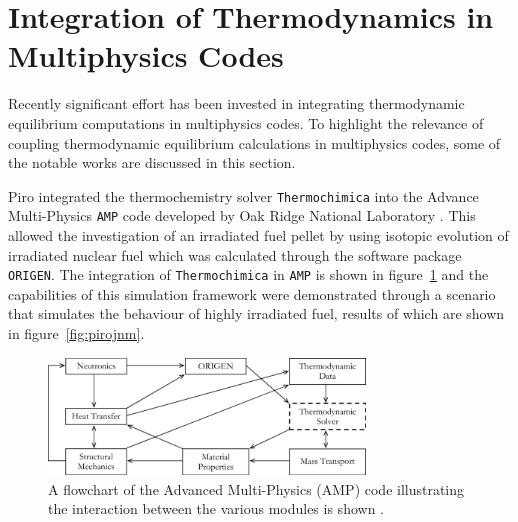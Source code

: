 \section{Integration of Thermodynamics in Multiphysics Codes}

	Recently significant effort has been invested in integrating thermodynamic equilibrium computations in multiphysics codes.  To highlight the relevance of coupling thermodynamic equilibrium calculations in multiphysics codes, some of the notable works are discussed in this section.

	Piro integrated the thermochemistry solver \texttt{Thermochimica} into the Advance Multi-Physics \texttt{AMP} code developed by Oak Ridge National Laboratory \cite{Piro11b}. This allowed the investigation of an irradiated fuel pellet by using isotopic evolution of irradiated nuclear fuel which was calculated through the software package \texttt{ORIGEN}. The integration of \texttt{Thermochimica} in \texttt{AMP} is shown in figure~\ref{fig:amp} and the capabilities of this simulation framework were demonstrated through a scenario that simulates the behaviour of highly irradiated  fuel, results of which are shown in figure~\ref{fig:pirojnm}.
	\begin{figure}[htbp]
		\begin{center}
		\includegraphics[width=0.75\textwidth]{figures/AMP_TC.png}
		\caption{A flowchart of the Advanced Multi-Physics (AMP) code illustrating the interaction between the various modules is shown \cite{Piro11b}.}
		\label{fig:amp}
		\end{center}
	\end{figure}

